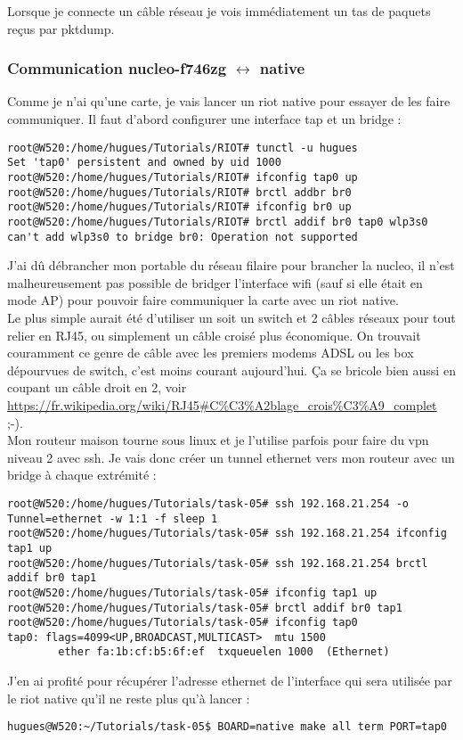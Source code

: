 Lorsque je connecte un câble réseau je vois immédiatement un tas de
paquets reçus par pktdump.\\


\subsubsection{Communication nucleo-f746zg $\leftrightarrow$ native}
Comme je n'ai qu'une carte, je vais lancer un riot native pour essayer
de les faire communiquer. Il faut d'abord configurer une interface tap
et un bridge :
\begin{verbatim}
root@W520:/home/hugues/Tutorials/RIOT# tunctl -u hugues
Set 'tap0' persistent and owned by uid 1000
root@W520:/home/hugues/Tutorials/RIOT# ifconfig tap0 up
root@W520:/home/hugues/Tutorials/RIOT# brctl addbr br0
root@W520:/home/hugues/Tutorials/RIOT# ifconfig br0 up
root@W520:/home/hugues/Tutorials/RIOT# brctl addif br0 tap0 wlp3s0
can't add wlp3s0 to bridge br0: Operation not supported
\end{verbatim}

J'ai dû débrancher mon portable du réseau filaire pour brancher la
nucleo, il n'est malheureusement pas possible de bridger l'interface
wifi (sauf si elle était en mode AP) pour pouvoir faire communiquer la
carte avec un riot native.\\

Le plus simple aurait été d'utiliser un soit un switch et 2 câbles
réseaux pour tout relier en RJ45, ou simplement un câble croisé plus
économique. On trouvait couramment ce genre de câble avec les premiers
modems ADSL ou les box dépourvues de switch, c'est moins courant
aujourd'hui. Ça se bricole bien aussi en coupant un câble droit en 2,
voir
\url{https://fr.wikipedia.org/wiki/RJ45#C%C3%A2blage_crois%C3%A9_complet}
;-).
\\

Mon routeur maison tourne sous
linux et je l'utilise parfois pour faire du vpn niveau 2 avec ssh.
Je vais donc créer un tunnel ethernet vers mon routeur avec un bridge à
chaque extrémité :
{\scriptsize
\begin{verbatim}
root@W520:/home/hugues/Tutorials/task-05# ssh 192.168.21.254 -o Tunnel=ethernet -w 1:1 -f sleep 1
root@W520:/home/hugues/Tutorials/task-05# ssh 192.168.21.254 ifconfig tap1 up
root@W520:/home/hugues/Tutorials/task-05# ssh 192.168.21.254 brctl addif br0 tap1
root@W520:/home/hugues/Tutorials/task-05# ifconfig tap1 up
root@W520:/home/hugues/Tutorials/task-05# brctl addif br0 tap1
root@W520:/home/hugues/Tutorials/task-05# ifconfig tap0
tap0: flags=4099<UP,BROADCAST,MULTICAST>  mtu 1500
        ether fa:1b:cf:b5:6f:ef  txqueuelen 1000  (Ethernet)
\end{verbatim}
}
J'en ai profité pour récupérer l'adresse ethernet de l'interface qui
sera utilisée par le riot native qu'il ne reste plus qu'à lancer :
\begin{verbatim}
hugues@W520:~/Tutorials/task-05$ BOARD=native make all term PORT=tap0
\end{verbatim}

